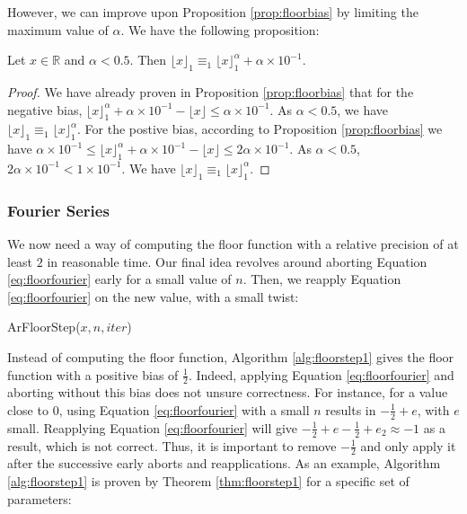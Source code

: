 \documentclass[runningheads]{llncs}
\begin{document}
However, we can improve upon Proposition \ref{prop:floorbias} by limiting the maximum value of $\alpha$. We have the following proposition:\begin{proposition}\label{prop:floorbiasopt}
  Let $x\in\mathbb{R}$ and $\alpha<\num{0.5}$. Then $\lfloor x\rfloor_1 \equiv_1 \lfloor x \rfloor_1^\alpha + \alpha\times10^{-1}$.
\end{proposition}
\begin{proof}
  We have already proven in Proposition \ref{prop:floorbias} that for the negative bias, $\lfloor x \rfloor_1^\alpha + \alpha\times 10^{-1} - \lfloor x \rfloor \leq \alpha\times 10^{-1}$. As $\alpha<0.5$, we have $\lfloor x \rfloor_1 \equiv_1 \lfloor x \rfloor_1^\alpha$. For the postive bias, according to Proposition \ref{prop:floorbias} we have $\alpha\times10^{-1} \leq \lfloor x \rfloor_1^\alpha + \alpha\times 10^{-1} - \lfloor x \rfloor \leq 2\alpha\times 10^{-1}$. As $\alpha<\num{0.5}$, $2\alpha\times 10^{-1}<1\times 10^{-1}$. We have $\lfloor x \rfloor_1 \equiv_1 \lfloor x \rfloor_1^\alpha$.
\end{proof}

\subsubsection{Fourier Series}
We now need a way of computing the floor function with a relative precision of at least $2$ in reasonable time. Our final idea revolves around aborting Equation \ref{eq:floorfourier} early for a small value of $n$. Then, we reapply Equation \ref{eq:floorfourier} on the new value, with a small twist:

\begin{algorithm}[H]
  \caption{ArFloorStep($x,n,iter$)}
  \label{alg:floorstep1}
\end{algorithm}
Instead of computing the floor function, Algorithm \ref{alg:floorstep1} gives the floor function with a positive bias of $\frac{1}{2}$. Indeed, applying Equation \ref{eq:floorfourier} and aborting without this bias does not unsure correctness. For instance, for a value close to $0$, using Equation \ref{eq:floorfourier} with a small $n$ results in $-\frac{1}{2} + e$, with $e$ small. Reapplying Equation \ref{eq:floorfourier} will give $-\frac{1}{2}+e-\frac{1}{2}+e_2 \approx -1$ as a result, which is not correct. Thus, it is important to remove $-\frac{1}{2}$ and only apply it after the successive early aborts and reapplications. As an example, Algorithm \ref{alg:floorstep1} is proven by Theorem \ref{thm:floorstep1} for a specific set of parameters:
\end{document}
